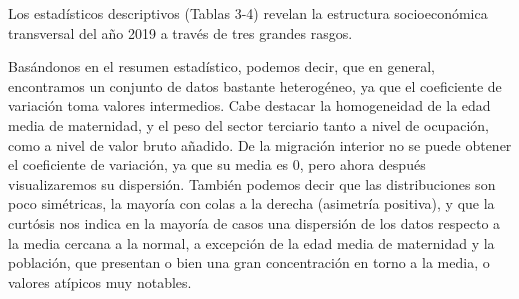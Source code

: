 \documentclass[data,article,submit,moreauthors,pdftex]{Definitions/mdpi}
\begin{document}
\begin{table}[!h]
\centering
\caption{\label{tab:univariante-tabla}Cuartiles y forma de la distribución (asimetría y exceso de curtosis de Fisher).}
\centering
{}
\end{table}

Los estadísticos descriptivos (Tablas 3-4) revelan la estructura
socioeconómica transversal del año 2019 a través de tres grandes rasgos.

Basándonos en el resumen estadístico, podemos decir, que en general,
encontramos un conjunto de datos bastante heterogéneo, ya que el
coeficiente de variación toma valores intermedios. Cabe destacar la
homogeneidad de la edad media de maternidad, y el peso del sector
terciario tanto a nivel de ocupación, como a nivel de valor bruto
añadido. De la migración interior no se puede obtener el coeficiente de
variación, ya que su media es 0, pero ahora después visualizaremos su
dispersión. También podemos decir que las distribuciones son poco
simétricas, la mayoría con colas a la derecha (asimetría positiva), y
que la curtósis nos indica en la mayoría de casos una dispersión de los
datos respecto a la media cercana a la normal, a excepción de la edad
media de maternidad y la población, que presentan o bien una gran
concentración en torno a la media, o valores atípicos muy notables.
\end{document}
